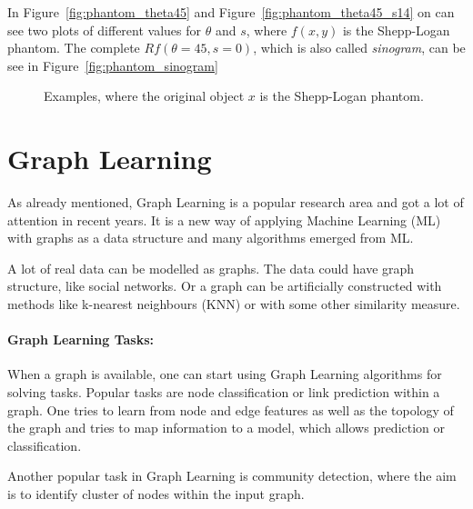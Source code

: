In Figure~\ref{fig:phantom_theta45} and Figure~\ref{fig:phantom_theta45_s14} on can see two plots of different
values for $\theta$ and $s$, where $f(x,y)$ is the Shepp-Logan phantom. The complete $Rf(\theta=45, s=0)$, 
which is also called \textit{sinogram}, can be see in Figure~\ref{fig:phantom_sinogram}

\begin{figure}[H]
    \centering
    \caption{Examples, where the original object $x$ is the Shepp-Logan phantom.}
    \label{fig:phantom}
\end{figure}


\section{Graph Learning}
As already mentioned, Graph Learning is a popular research area and got a lot of attention in recent years.
It is a new way of applying Machine Learning (ML) with graphs as a data structure and many algorithms emerged from ML.

A lot of real data can be modelled as graphs. The data could have graph structure, like social networks. 
Or a graph can be artificially constructed with methods like k-nearest neighbours (KNN) or with some other similarity
measure.

\paragraph{Graph Learning Tasks:}
When a graph is available, one can start using Graph Learning algorithms for solving tasks.
Popular tasks are node classification or link prediction within a graph. One tries to learn from node and edge features 
as well as the topology of the graph and tries to map information to a model, which allows prediction or classification.

Another popular task in Graph Learning is community detection, where the aim is to identify cluster of nodes within the input graph.

